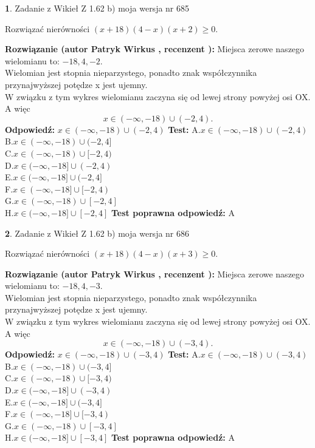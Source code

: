 \documentclass[12pt, a4paper]{article}
\theoremstyle{definition} %
\newtheorem{zad}{}
\newcommand{\zadStart}[1]{\begin{zad}#1\newline}
\newcommand{\zadStop}{\end{zad}}
\newcommand{\rozwStart}[2]{\noindent \textbf{Rozwiązanie (autor #1 , recenzent #2): }\newline}
\newcommand{\rozwStop}{\newline}
\newcommand{\odpStart}{\noindent \textbf{Odpowiedź:}\newline}
\newcommand{\odpStop}{\newline}
\newcommand{\testStart}{\noindent \textbf{Test:}\newline}
\newcommand{\testStop}{\newline}
\newcommand{\kluczStart}{\noindent \textbf{Test poprawna odpowiedź:}\newline}
\newcommand{\kluczStop}{\newline}
\begin{document}
\zadStart{Zadanie z Wikieł Z 1.62 b) moja wersja nr 685}

Rozwiązać nierówności $(x+18)(4-x)(x+2)\ge0$.
\zadStop
\rozwStart{Patryk Wirkus}{}
Miejsca zerowe naszego wielomianu to: $-18, 4, -2$.\\
Wielomian jest stopnia nieparzystego, ponadto znak współczynnika przy\linebreak najwyższej potędze x jest ujemny.\\ W związku z tym wykres wielomianu zaczyna się od lewej strony powyżej osi OX. A więc $$x \in (-\infty,-18) \cup (-2,4).$$
\rozwStop
\odpStart
$x \in (-\infty,-18) \cup (-2,4)$
\odpStop
\testStart
A.$x \in (-\infty,-18) \cup (-2,4)$\\
B.$x \in (-\infty,-18) \cup (-2,4]$\\
C.$x \in (-\infty,-18) \cup [-2,4)$\\
D.$x \in (-\infty,-18] \cup (-2,4)$\\
E.$x \in (-\infty,-18] \cup (-2,4]$\\
F.$x \in (-\infty,-18] \cup [-2,4)$\\
G.$x \in (-\infty,-18) \cup [-2,4]$\\
H.$x \in (-\infty,-18] \cup [-2,4]$
\testStop
\kluczStart
A
\kluczStop



\zadStart{Zadanie z Wikieł Z 1.62 b) moja wersja nr 686}

Rozwiązać nierówności $(x+18)(4-x)(x+3)\ge0$.
\zadStop
\rozwStart{Patryk Wirkus}{}
Miejsca zerowe naszego wielomianu to: $-18, 4, -3$.\\
Wielomian jest stopnia nieparzystego, ponadto znak współczynnika przy\linebreak najwyższej potędze x jest ujemny.\\ W związku z tym wykres wielomianu zaczyna się od lewej strony powyżej osi OX. A więc $$x \in (-\infty,-18) \cup (-3,4).$$
\rozwStop
\odpStart
$x \in (-\infty,-18) \cup (-3,4)$
\odpStop
\testStart
A.$x \in (-\infty,-18) \cup (-3,4)$\\
B.$x \in (-\infty,-18) \cup (-3,4]$\\
C.$x \in (-\infty,-18) \cup [-3,4)$\\
D.$x \in (-\infty,-18] \cup (-3,4)$\\
E.$x \in (-\infty,-18] \cup (-3,4]$\\
F.$x \in (-\infty,-18] \cup [-3,4)$\\
G.$x \in (-\infty,-18) \cup [-3,4]$\\
H.$x \in (-\infty,-18] \cup [-3,4]$
\testStop
\kluczStart
A
\kluczStop
\end{document}
